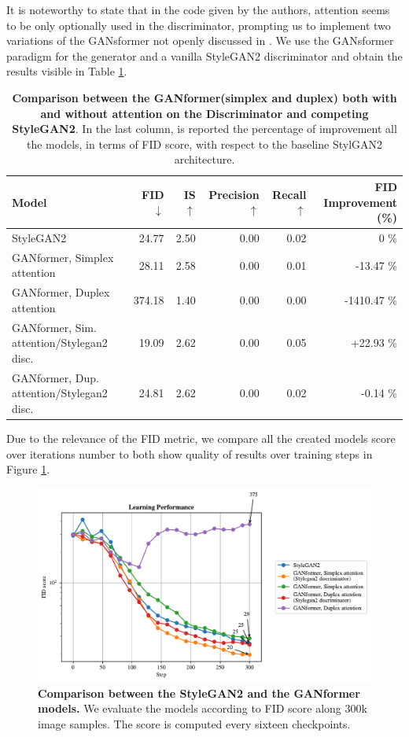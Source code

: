 \documentclass{article}
\begin{document}
    It is noteworthy to state that in the code given by the authors, attention seems to be only optionally 
    used in the discriminator, prompting us to implement two variations of the GANsformer not openly 
    discussed in \cite{hudson2021generative}.
    We use the GANsformer paradigm for the generator and a vanilla StyleGAN2 discriminator and 
    obtain the results visible in Table \ref{tab:our-results2}.
    \begin{table}[htb]
    	\centering
        \caption{\textbf{Comparison between the GANformer(simplex and duplex) both with and without 
        attention on the Discriminator and competing StyleGAN2}.  In the last column, is reported the 
        percentage of improvement all the models, in terms of FID score, with respect to the baseline 
        StylGAN2 architecture.}
        \label{tab:our-results2}
        \vspace{3mm}
        \small
        \begin{tabular}{l|rrrrr}
	        \toprule
	        Model                        & FID $\downarrow$  & IS $\uparrow$& Precision $\uparrow$& Recall 
	        $\uparrow$& FID Improvement (\%)\\ 
	        \midrule
	        StyleGAN2                    &  24.77 & 2.50 & 0.00 & 0.02 & 0 \%\\ 
			GANformer, Simplex attention & 28.11 & 2.58 & 0.00 & 0.01 & -13.47 \%\\ 
			GANformer, Duplex attention  & 374.18 & 1.40 & 0.00 & 0.00 & -1410.47  \%\\ 
	        GANformer, Sim. attention/Stylegan2 disc. & 19.09 &  2.62  &  0.00    & 0.05  & 
	        +22.93 \% \\ 
	        GANformer, Dup. attention/Stylegan2 disc.  &  24.81  & 2.62 &   0.00   & 0.02 & 
	        -0.14 \%\\ 
	        \bottomrule
        \end{tabular}
        \end{table}
       
	Due to the relevance of the FID metric, we compare all the created models score over iterations 
	number to both show quality of results over training steps in Figure \ref{fig:performance}.
	\begin{figure}[htpb]				
		\centering
		\raggedleft
		\includegraphics[width=.8\linewidth]{../src/trained_network/out_imgs/FIDscore.pdf}
		\caption{\textbf{Comparison between the StyleGAN2 and the GANformer models.} We evaluate 
		the models according to FID score along 300k image samples. The score is computed every 
		sixteen checkpoints.}
		\label{fig:performance}
	\end{figure}
	
\end{document}
